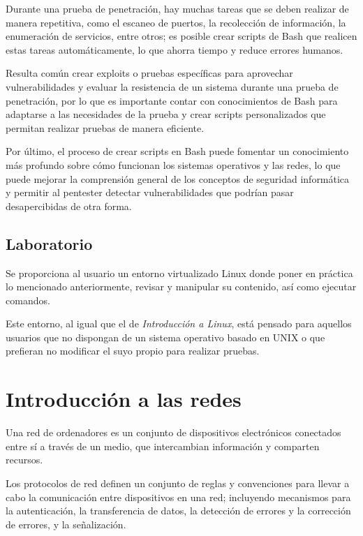             Durante una prueba de penetración, hay muchas tareas que se deben realizar de manera repetitiva, como el escaneo de puertos, la recolección de información, la enumeración de servicios, entre otros; es posible crear scripts de Bash que realicen estas tareas automáticamente, lo que ahorra tiempo y reduce errores humanos.

            Resulta común crear exploits o pruebas específicas para aprovechar vulnerabilidades y evaluar la resistencia de un sistema durante una prueba de penetración, por lo que es importante contar con conocimientos de Bash para adaptarse a las necesidades de la prueba y crear scripts personalizados que permitan realizar pruebas de manera eficiente.

            Por último, el proceso de crear scripts en Bash puede fomentar un conocimiento más profundo sobre cómo funcionan los sistemas operativos y las redes, lo que puede mejorar la comprensión general de los conceptos de seguridad informática y permitir al pentester detectar vulnerabilidades que podrían pasar desapercibidas de otra forma.

        \subsection{Laboratorio}

            Se proporciona al usuario un entorno virtualizado Linux donde poner en práctica lo mencionado anteriormente, revisar y manipular su contenido, así como ejecutar comandos.

            Este entorno, al igual que el de \textit{Introducción a Linux}, está pensado para aquellos usuarios que no dispongan de un sistema operativo basado en UNIX o que prefieran no modificar el suyo propio para realizar pruebas.


    \section{Introducción a las redes}

        Una red de ordenadores es un conjunto de dispositivos electrónicos conectados entre sí a través de un medio, que intercambian información y comparten recursos.
            
        Los protocolos de red definen un conjunto de reglas y convenciones para llevar a cabo la comunicación entre dispositivos en una red; incluyendo mecanismos para la autenticación, la transferencia de datos, la detección de errores y la corrección de errores, y la señalización.


